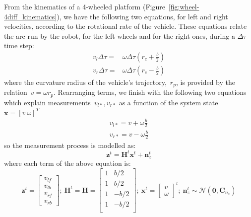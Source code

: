 From the kinematics of a 4-wheeled platform (Figure~\ref{fig:wheel-4diff_kinematics}), we have the following two equations, for left and right velocities, according to the rotational rate of the vehicle. These equations relate the arc run by the robot, for the left-wheels and for the right ones, during a $\Delta\tau$ time step:
\begin{equation}
\begin{array}{cc}
 v_l\Delta\tau = & \omega\Delta\tau(r_c+\frac{b}{2}) \\
 v_r\Delta\tau = & \omega\Delta\tau(r_c-\frac{b}{2}) 
\end{array}
\label{eq:v_l_v_r}
\end{equation}
where the curvature radius of the vehicle's trajectory,~$r_p$, is provided by the relation~$v=\omega r_p$. Rearranging terms, we finish with the following two equations which explain measurements~$v_{l*},v_{r*}$ as a function of the system state~$\mathbf{x}=[v\ \omega]^T$
\begin{equation}
\begin{array}{cc}
 v_{l*} = v+\omega\frac{b}{2} \\
 v_{r*} = v-\omega\frac{b}{2}
\end{array}
\end{equation}
so the measurement process is modelled as:
\begin{equation}
 \mathbf{z}^t = \mathbf{H}^t\mathbf{x}^t + \mathbf{n}^t_z 
\end{equation}
where each term of the above equation is:
\begin{equation}
 \mathbf{z}^t =
 \left[
 \begin{array}{c}
  v_{lf}\\
  v_{lb}\\
  v_{rf}\\
  v_{rb}
 \end{array}
 \right]; \ 
 \mathbf{H}^t = \mathbf{H} = 
 \left[
 \begin{array}{cc}
  1 & b/2 \\
  1 & b/2 \\
  1 & -b/2 \\
  1 & -b/2 \\
 \end{array}
 \right];\ 
 \mathbf{x}^t=
 \left[
 \begin{array}{c}
  v\\
  \omega
 \end{array}
 \right]^t;\ 
 \mathbf{n}^t_z \sim \mathcal{N}(\mathbf{0},\mathbf{C}_{n_z})
\end{equation}
